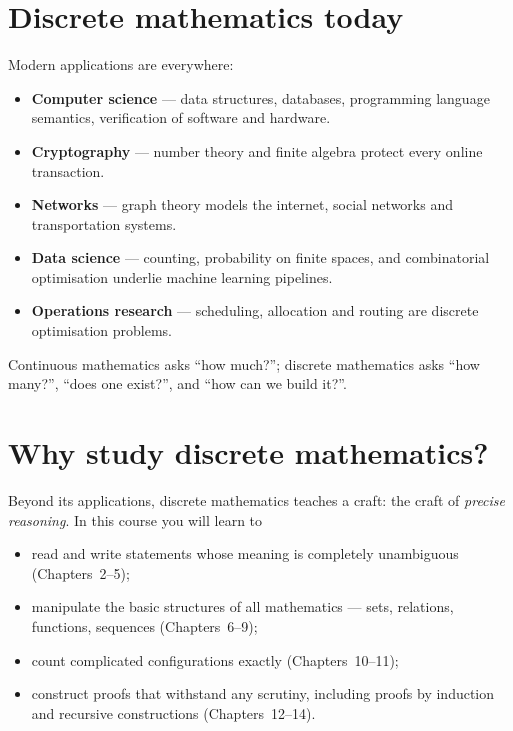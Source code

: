\section{Discrete mathematics today}

Modern applications are everywhere:

\begin{itemize}
\item \textbf{Computer science} --- data structures, databases, programming
  language semantics, verification of software and hardware.
\item \textbf{Cryptography} --- number theory and finite algebra protect every
  online transaction.
\item \textbf{Networks} --- graph theory models the internet, social networks
  and transportation systems.
\item \textbf{Data science} --- counting, probability on finite spaces, and
  combinatorial optimisation underlie machine learning pipelines.
\item \textbf{Operations research} --- scheduling, allocation and routing are
  discrete optimisation problems.
\end{itemize}

\begin{notebox}
Continuous mathematics asks ``how much?''; discrete mathematics asks
``how many?'', ``does one exist?'', and ``how can we build it?''.
\end{notebox}

\section{Why study discrete mathematics?}

Beyond its applications, discrete mathematics teaches a craft: the craft of
\emph{precise reasoning}. In this course you will learn to

\begin{itemize}
\item read and write statements whose meaning is completely unambiguous
  (Chapters~2--5);
\item manipulate the basic structures of all mathematics --- sets, relations,
  functions, sequences (Chapters~6--9);
\item count complicated configurations exactly (Chapters~10--11);
\item construct proofs that withstand any scrutiny, including proofs by
  induction and recursive constructions (Chapters~12--14).
\end{itemize}

